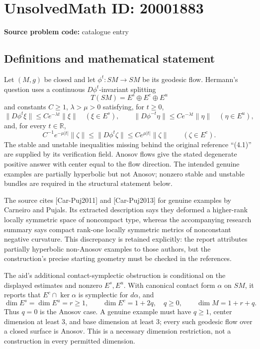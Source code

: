 \documentclass[11pt]{article}
\begin{document}
\section*{UnsolvedMath ID: 20001883}
\textbf{Source problem code:} catalogue entry
\subsection{Definitions and mathematical statement}
Let \((M,g)\) be closed and let \(\phi^t:SM\to SM\) be its geodesic flow. Hermann's question uses a continuous \(D\phi^t\)-invariant splitting
\[
 T(SM)=E^s\oplus E^c\oplus E^u
\]
and constants \(C\geq1\), \(\lambda>\mu>0\) satisfying, for \(t\geq0\),
\[
 \|D\phi^t\xi\|\leq Ce^{-\lambda t}\|\xi\|\quad(\xi\in E^s),\qquad
 \|D\phi^{-t}\eta\|\leq Ce^{-\lambda t}\|\eta\|\quad(\eta\in E^u),
\]
and, for every \(t\in\mathbb R\),
\[
 C^{-1}e^{-\mu|t|}\|\zeta\|\leq\|D\phi^t\zeta\|
 \leq Ce^{\mu|t|}\|\zeta\|\qquad(\zeta\in E^c).
\]
The stable and unstable inequalities missing behind the original reference ``(4.1)'' are supplied by its verification field. Anosov flows give the stated degenerate positive answer with center equal to the flow direction. The intended genuine examples are partially hyperbolic but not Anosov; nonzero stable and unstable bundles are required in the structural statement below.

The source cites [Car-Puj2011] and [Car-Puj2013] for genuine examples by Carneiro and Pujals. Its extracted description says they deformed a higher-rank locally symmetric space of noncompact type, whereas the accompanying research summary says compact rank-one locally symmetric metrics of nonconstant negative curvature. This discrepancy is retained explicitly: the report attributes partially hyperbolic non-Anosov examples to those authors, but the construction's precise starting geometry must be checked in the references.

The aid's additional contact-symplectic obstruction is conditional on the displayed estimates and nonzero \(E^s,E^u\). With canonical contact form \(\alpha\) on \(SM\), it reports that \(E^c\cap\ker\alpha\) is symplectic for \(d\alpha\), and
\[
 \dim E^s=\dim E^u=r\geq1,\qquad
 \dim E^c=1+2q,\quad q\geq0,\qquad
 \dim M=1+r+q.
\]
Thus \(q=0\) is the Anosov case. A genuine example must have \(q\geq1\), center dimension at least \(3\), and base dimension at least \(3\); every such geodesic flow over a closed surface is Anosov. This is a necessary dimension restriction, not a construction in every permitted dimension.
\end{document}
